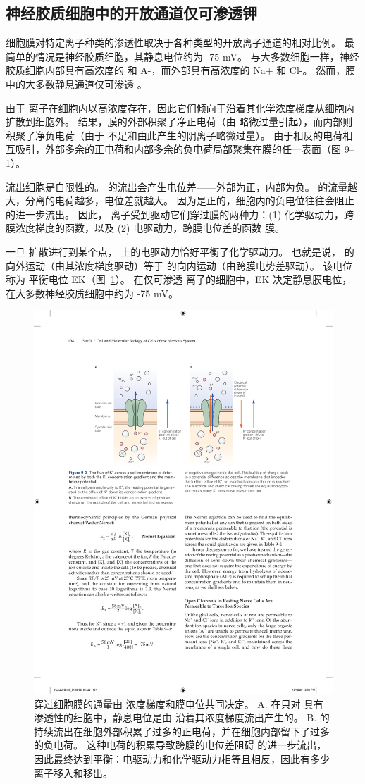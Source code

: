 \subsection{神经胶质细胞中的开放通道仅可渗透钾}

细胞膜对特定离子种类的渗透性取决于各种类型的开放离子通道的相对比例。
最简单的情况是神经胶质细胞，其静息电位约为 -75 mV。
与大多数细胞一样，神经胶质细胞内部具有高浓度的  和 A-，而外部具有高浓度的 Na+ 和 Cl-。
然而，膜中的大多数静息通道仅可渗透 。


由于  离子在细胞内以高浓度存在，因此它们倾向于沿着其化学浓度梯度从细胞内扩散到细胞外。
结果，膜的外部积聚了净正电荷（由  略微过量引起），而内部则积聚了净负电荷（由于  不足和由此产生的阴离子略微过量）。
由于相反的电荷相互吸引，外部多余的正电荷和内部多余的负电荷局部聚集在膜的任一表面（图 9–1）。


 流出细胞是自限性的。
 的流出会产生电位差——外部为正，内部为负。
 的流量越大，分离的电荷越多，电位差就越大。
因为是正的，细胞内的负电位往往会阻止的进一步流出。
因此， 离子受到驱动它们穿过膜的两种力：(1) 化学驱动力，跨膜浓度梯度的函数，以及 (2) 电驱动力，跨膜电位差的函数 膜。


一旦  扩散进行到某个点， 上的电驱动力恰好平衡了化学驱动力。
也就是说， 的向外运动（由其浓度梯度驱动）等于  的向内运动（由跨膜电势差驱动）。
该电位称为  平衡电位 EK（图~\ref{fig:9_3}）。
在仅可渗透  离子的细胞中，EK 决定静息膜电位，在大多数神经胶质细胞中约为 -75 mV。


\begin{figure}[htbp]
	\centering
	\includegraphics[width=0.7\linewidth]{chap09/fig_9_3}
	\caption{ 穿过细胞膜的通量由  浓度梯度和膜电位共同决定。 A. 在只对  具有渗透性的细胞中，静息电位是由  沿着其浓度梯度流出产生的。 B.  的持续流出在细胞外部积累了过多的正电荷，并在细胞内部留下了过多的负电荷。 这种电荷的积累导致跨膜的电位差阻碍  的进一步流出，因此最终达到平衡：电驱动力和化学驱动力相等且相反，因此有多少  离子移入和移出。}
	\label{fig:9_3}
\end{figure}


